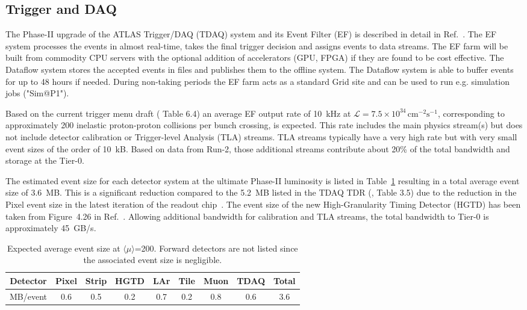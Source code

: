 \subsection{Trigger and DAQ}

The Phase-II upgrade of the ATLAS Trigger/DAQ (TDAQ) system and its Event Filter (EF) is described in detail in Ref.~\cite{ATLAS-TDR-29}. The EF system processes the events in almost real-time, takes the final trigger decision and assigns events to data streams. The EF farm will be built from commodity CPU servers with the optional addition of accelerators (GPU, FPGA) if they are found to be cost effective. The Dataflow system stores the accepted events in files and publishes them to the offline system. The Dataflow system is able to buffer events for up to 48 hours if needed.
During non-taking periods the EF farm acts as a standard Grid site and can be used to run e.g. simulation jobs ("Sim@P1").

Based on the current trigger menu draft (\cite{ATLAS-TDR-29} Table 6.4) an average EF output rate of 10~kHz at $\mathcal{L}=7.5\times10^{34}\,\mathrm{cm^{-2}s^{-1}}$, corresponding to approximately 200 inelastic proton-proton collisions per bunch crossing, is expected. This rate includes the main physics stream(s) but does not include detector calibration or Trigger-level Analysis (TLA) streams. TLA streams typically have a very high rate but with very small event sizes of the order of 10~kB. Based on data from Run-2, those additional streams contribute about 20\% of the total bandwidth and storage at the Tier-0. 

The estimated event size for each detector system at the ultimate Phase-II luminosity is listed in Table~\ref{tab:event_size} resulting in a total average event size of 3.6~MB.
This is a significant reduction compared to the 5.2~MB listed in the TDAQ TDR (\cite{ATLAS-TDR-29}, Table 3.5) due to the reduction in the Pixel event size in the latest iteration of the readout chip~\cite{ATL-ITK-INT-2019-001}. The event size of the new High-Granularity Timing Detector (HGTD) has been taken from Figure~4.26 in Ref.~\cite{ATLAS-HGTD-TP}.
Allowing additional bandwidth for calibration and TLA streams, the total bandwidth to Tier-0 is approximately 45~GB/s.

\begin{table}[htb!]
    \centering
    \begin{tabular}{|c||c|c|c|c|c|c|c||c|} \hline
         Detector & Pixel & Strip & HGTD  & LAr   & Tile  & Muon  & TDAQ  & Total \\ \hline
         MB/event & 0.6   & 0.5   & 0.2   & 0.7   & 0.2   & 0.8   & 0.6   & 3.6 \\ \hline
    \end{tabular}
    \caption{Expected average event size at $\langle\mu\rangle$=200. Forward detectors are not listed since the associated event size is negligible.}
    \label{tab:event_size}
\end{table}


